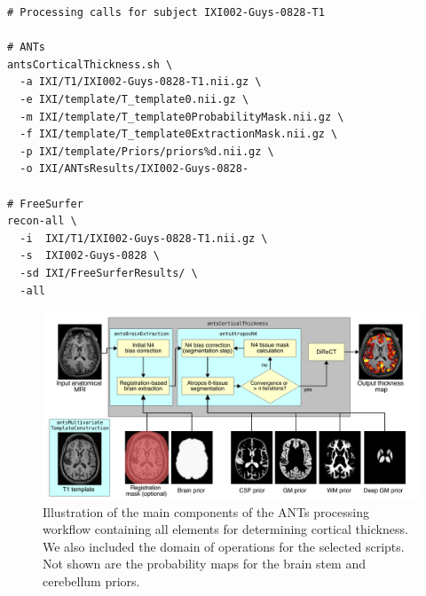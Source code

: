 \begin{lstlisting}
# Processing calls for subject IXI002-Guys-0828-T1

# ANTs
antsCorticalThickness.sh \
  -a IXI/T1/IXI002-Guys-0828-T1.nii.gz \
  -e IXI/template/T_template0.nii.gz \
  -m IXI/template/T_template0ProbabilityMask.nii.gz \
  -f IXI/template/T_template0ExtractionMask.nii.gz \  
  -p IXI/template/Priors/priors%d.nii.gz \
  -o IXI/ANTsResults/IXI002-Guys-0828-

# FreeSurfer  
recon-all \
  -i  IXI/T1/IXI002-Guys-0828-T1.nii.gz \
  -s  IXI002-Guys-0828 \
  -sd IXI/FreeSurferResults/ \
  -all
\end{lstlisting}



\begin{figure}
  \centering
  \includegraphics[width=180mm]{Figures/Kapowski_pipeline2.pdf}
  \caption{Illustration of the main components of the ANTs processing 
  workflow containing all elements for determining cortical thickness. 
  We also included the domain of operations for the selected scripts.
  Not shown are the probability maps for the brain stem and cerebellum
  priors.}
  \label{fig:pipeline}
\end{figure}

